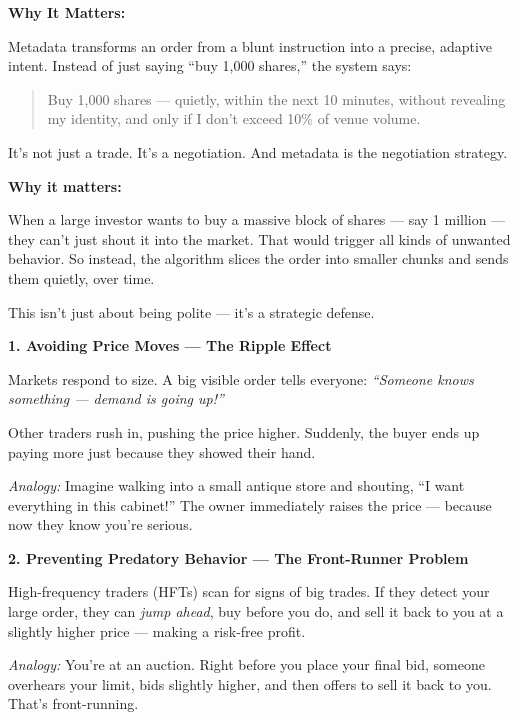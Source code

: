 \medskip

\textbf{Why It Matters:}

Metadata transforms an order from a blunt instruction into a precise, adaptive intent.  
Instead of just saying “buy 1,000 shares,” the system says:

\begin{quote}
Buy 1,000 shares — quietly, within the next 10 minutes,  
without revealing my identity,  
and only if I don’t exceed 10\% of venue volume.
\end{quote}

It’s not just a trade.  
It’s a negotiation.  
And metadata is the negotiation strategy.






\textbf{Why it matters:}

When a large investor wants to buy a massive block of shares — say 1 million — they can’t just shout it into the market. That would trigger all kinds of unwanted behavior. So instead, the algorithm slices the order into smaller chunks and sends them quietly, over time.

This isn’t just about being polite — it’s a strategic defense.

\medskip

\textbf{1. Avoiding Price Moves — The Ripple Effect}

Markets respond to size. A big visible order tells everyone:
\textit{“Someone knows something — demand is going up!”}

Other traders rush in, pushing the price higher. Suddenly, the buyer ends up paying more just because they showed their hand.

\textit{Analogy:}  
Imagine walking into a small antique store and shouting, “I want everything in this cabinet!”  
The owner immediately raises the price — because now they know you’re serious.

\medskip

\textbf{2. Preventing Predatory Behavior — The Front-Runner Problem}

High-frequency traders (HFTs) scan for signs of big trades.  
If they detect your large order, they can \textit{jump ahead}, buy before you do, and sell it back to you at a slightly higher price — making a risk-free profit.

\textit{Analogy:}  
You’re at an auction. Right before you place your final bid, someone overhears your limit, bids slightly higher, and then offers to sell it back to you.  
That’s front-running.

